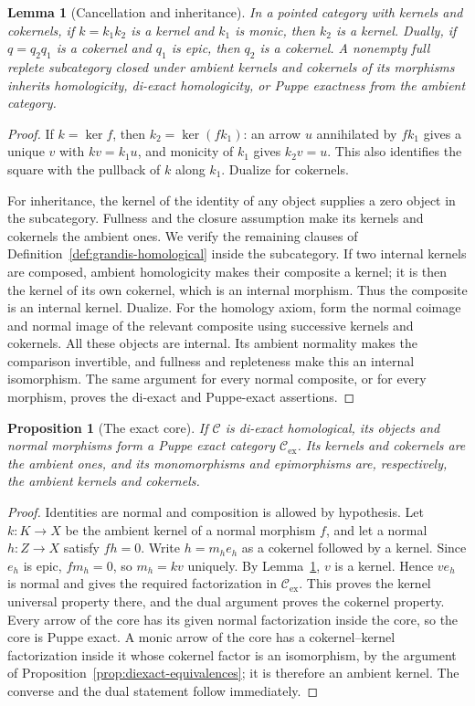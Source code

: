\documentclass[11pt,reqno,a4paper]{amsart}
\newtheorem{lemma}[theorem]{Lemma}
\newtheorem{proposition}[theorem]{Proposition}
\theoremstyle{definition}
\theoremstyle{remark}
\newcommand{\C}{\mathcal{C}}
\newcommand{\0}{\mathbf{0}}
\renewcommand{\1}{\mathbf{1}}
\begin{document}
\begin{lemma}[Cancellation and inheritance]\label{lem:inheritance}
In a pointed category with kernels and cokernels, if $k=k_1k_2$ is a
kernel and $k_1$ is monic, then $k_2$ is a kernel. Dually, if $q=q_2q_1$
is a cokernel and $q_1$ is epic, then $q_2$ is a cokernel.
A nonempty full replete subcategory closed under ambient kernels and
cokernels of its morphisms inherits homologicity, di-exact
homologicity, or Puppe exactness from the ambient category.
\end{lemma}
\begin{proof}
If $k=\ker f$, then $k_2=\ker(fk_1)$: an arrow $u$ annihilated by
$fk_1$ gives a unique $v$ with $kv=k_1u$, and monicity of $k_1$ gives
$k_2v=u$. This also identifies the square with the pullback of $k$
along $k_1$. Dualize for cokernels.

For inheritance, the kernel of the identity of any object supplies a
zero object in the subcategory. Fullness and the closure assumption
make its kernels and cokernels the ambient ones. We verify the
remaining clauses of Definition~\ref{def:grandis-homological}
inside the subcategory. If two internal kernels are composed,
ambient homologicity makes their composite a kernel;
it is then the kernel of its own cokernel, which is an internal
morphism. Thus the composite is an internal kernel. Dualize. For the
homology axiom, form the normal coimage and normal image of the relevant
composite using successive kernels and cokernels. All these objects
are internal. Its ambient normality makes the comparison invertible,
and fullness and repleteness make this an internal isomorphism.
The same argument for every normal composite, or for every morphism,
proves the di-exact and Puppe-exact assertions.
\end{proof}

\begin{proposition}[The exact core]\label{prop:exact-core}
If $\C$ is di-exact homological, its objects and normal morphisms form
a Puppe exact category $\C_{\mathrm{ex}}$. Its kernels and cokernels
are the ambient ones, and its monomorphisms and epimorphisms are,
respectively, the ambient kernels and cokernels.
\end{proposition}
\begin{proof}
Identities are normal and composition is allowed by hypothesis. Let
$k:K\to X$ be the ambient kernel of a normal morphism $f$, and let
a normal $h:Z\to X$ satisfy $fh=0$. Write $h=m_he_h$ as a cokernel followed by a kernel.
Since $e_h$ is epic, $fm_h=0$, so $m_h=kv$ uniquely.
By Lemma~\ref{lem:inheritance}, $v$ is a kernel. Hence $ve_h$ is normal
and gives the required factorization in $\C_{\mathrm{ex}}$.
This proves the kernel universal property there, and the dual argument
proves the cokernel property. Every arrow of the core has its given
normal factorization inside the core, so the core is Puppe exact.
A monic arrow of the core has a cokernel--kernel factorization inside it whose
cokernel factor is an isomorphism, by the argument of
Proposition~\ref{prop:diexact-equivalences}; it is therefore an ambient
kernel. The converse and the dual statement follow immediately.
\end{proof}
\end{document}
